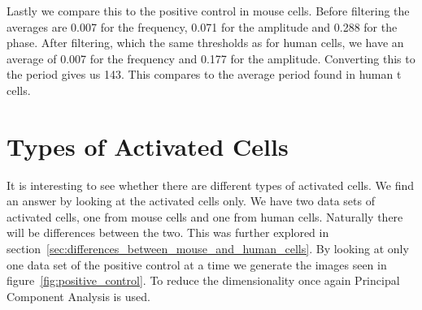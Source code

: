 Lastly we compare this to the positive control in mouse cells. Before filtering the averages are 0.007 for the frequency, 0.071 for the amplitude and 0.288 for the phase. After filtering, which the same thresholds as for human cells, we have an average of 0.007 for the frequency and 0.177 for the amplitude. Converting this to the period gives us 143. This compares to the average period found in human t cells.

\section{Types of Activated Cells}

It is interesting to see whether there are different types of activated cells. We find an answer by looking at the activated cells only. We have two data sets of activated cells, one from mouse cells and one from human cells. Naturally there will be differences between the two. This was further explored in section~\ref{sec:differences_between_mouse_and_human_cells}. By looking at only one data set of the positive control at a time we generate the images seen in figure~\ref{fig:positive_control}. To reduce the dimensionality once again Principal Component Analysis is used.

